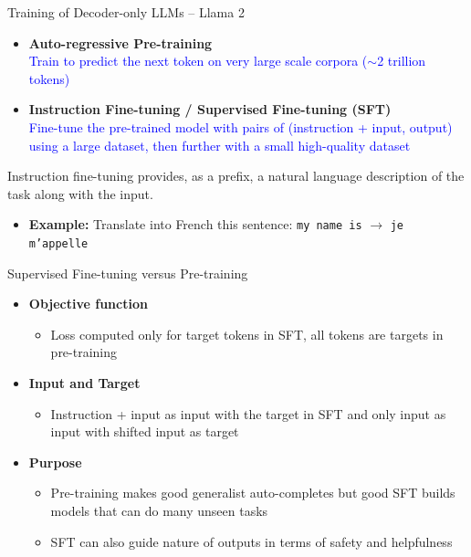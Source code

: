 \begin{frame}[t]{Training of Decoder-only LLMs -- Llama 2}
  \begin{itemize}
    \item \textbf{Auto-regressive Pre-training} \\
      \textcolor{blue}{Train to predict the next token on very large scale corpora ($\sim$2 trillion tokens)}
    \item \textbf{Instruction Fine-tuning / Supervised Fine-tuning (SFT)} \\
      \textcolor{blue}{Fine-tune the pre-trained model with pairs of (instruction + input, output) using a large dataset, then further with a small high-quality dataset}
  \end{itemize}
  \vspace{1em}
  Instruction fine-tuning provides, as a prefix, a natural language description of the task along with the input.
  \begin{itemize}
    \item \textbf{Example:} Translate into French this sentence: \texttt{my name is} $\rightarrow$ \texttt{je m'appelle}
  \end{itemize}
\end{frame}

\begin{frame}{Supervised Fine-tuning versus Pre-training}
  \begin{itemize}
    \item \textbf{Objective function}
      \begin{itemize}
        \item Loss computed only for target tokens in SFT, all tokens are targets in pre-training
      \end{itemize}
    \item \textbf{Input and Target}
      \begin{itemize}
        \item Instruction + input as input with the target in SFT and only input as input with shifted input as target
      \end{itemize}
    \item \textbf{Purpose}
      \begin{itemize}
        \item Pre-training makes good generalist auto-completes but good SFT builds models that can do many unseen tasks
        \item SFT can also guide nature of outputs in terms of safety and helpfulness
      \end{itemize}
  \end{itemize}
\end{frame}

